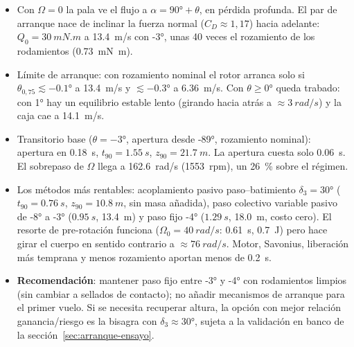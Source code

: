 \begin{resultado}
\begin{itemize}
  \item Con $\Omega=0$ la pala ve el flujo a $\alpha=\ang{90}+\theta$, en pérdida profunda. El
        par de arranque nace de inclinar la fuerza normal ($C_D\approx1{,}17$) hacia adelante:
        $Q_0=\SI{30}{mN.m}$ a \SI{13.4}{m/s} con \ang{-3}, unas 40 veces el rozamiento de
        los rodamientos (\SI{0.73}{mN.m}).
  \item Límite de arranque: con rozamiento nominal el rotor arranca solo si
        $\theta_{0,75}\lesssim\ang{-0.1}$ a \SI{13.4}{m/s} y $\lesssim\ang{-0.3}$ a
        \SI{6.36}{m/s}. Con $\theta\ge\ang{0}$ queda trabado: con \ang{+1} hay un equilibrio
        estable lento (girando hacia atrás a $\approx\SI{3}{rad/s}$) y la caja cae a
        \SI{14.1}{m/s}.
  \item Transitorio base ($\theta=\ang{-3}$, apertura desde \ang{-89}, rozamiento nominal):
        apertura en \SI{0.18}{s}, $t_{90}=\SI{1.55}{s}$, $z_{90}=\SI{21.7}{m}$. La apertura
        cuesta solo \SI{0.06}{s}. El sobrepaso de $\Omega$ llega a \SI{162.6}{rad/s}
        (\num{1553}~rpm), un \SI{26}{\percent} sobre el régimen.
  \item Los métodos más rentables: acoplamiento pasivo paso--batimiento $\delta_3=\ang{30}$
        ($t_{90}=\SI{0.76}{s}$, $z_{90}=\SI{10.8}{m}$, sin masa añadida), paso colectivo variable
        pasivo de \ang{-8} a \ang{-3} ($\SI{0.95}{s}$, \SI{13.4}{m}) y paso fijo \ang{-4}
        ($\SI{1.29}{s}$, \SI{18.0}{m}, costo cero). El resorte de pre-rotación funciona
        ($\Omega_0=\SI{40}{rad/s}$: \SI{0.61}{s}, \SI{0.7}{J}) pero hace girar el cuerpo
        en sentido contrario a $\approx\SI{76}{rad/s}$. Motor, Savonius, liberación más
        temprana y menos rozamiento aportan menos de \SI{0.2}{s}.
  \item \textbf{Recomendación}: mantener paso fijo entre \ang{-3} y \ang{-4} con rodamientos
        limpios (sin cambiar a sellados de contacto); no añadir mecanismos de arranque para el
        primer vuelo. Si se necesita recuperar altura, la opción con mejor relación
        ganancia/riesgo es la bisagra con $\delta_3\approx\ang{30}$, sujeta a la validación
        en banco de la sección~\ref{sec:arranque-ensayo}.
\end{itemize}
\end{resultado}

